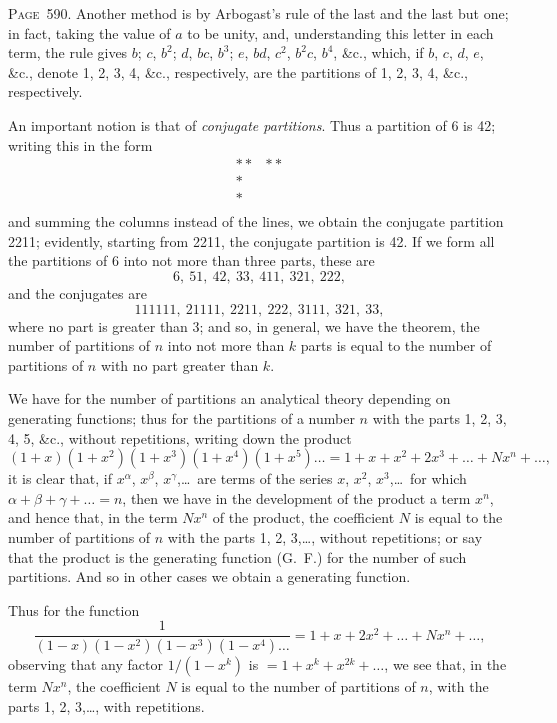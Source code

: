 \documentclass[11pt,a4paper]{book}
\begin{document}
\newpage
\noindent\textsc{Page~590.} Another method is by Arbogast's rule of the last and the last but one; in fact, taking the value of $a$ to be unity, and, understanding this letter in each term, the rule gives $b$; $c$, $b^2$; $d$, $bc$, $b^3$; $e$, $bd$, $c^2$, $b^2c$, $b^4$, \&c., which, if $b$, $c$, $d$, $e$, \&c., denote 1, 2, 3, 4, \&c., respectively, are the partitions of 1, 2, 3, 4, \&c., respectively.

An important notion is that of \textit{conjugate partitions}. Thus a partition of 6 is 42; writing this in the form
\[
\begin{array}{cc}
** & ** \\
* & \\
* & \\
\end{array}
\]
and summing the columns instead of the lines, we obtain the conjugate partition 2211; evidently, starting from 2211, the conjugate partition is 42. If we form all the partitions of 6 into not more than three parts, these are
\[
6,\ 51,\ 42,\ 33,\ 411,\ 321,\ 222,
\]
and the conjugates are
\[
111111,\ 21111,\ 2211,\ 222,\ 3111,\ 321,\ 33,
\]
where no part is greater than 3; and so, in general, we have the theorem, the number of partitions of $n$ into not more than $k$ parts is equal to the number of partitions of $n$ with no part greater than $k$.

We have for the number of partitions an analytical theory depending on generating functions; thus for the partitions of a number $n$ with the parts 1, 2, 3, 4, 5, \&c., without repetitions, writing down the product
\[
(1+x)(1+x^2)(1+x^3)(1+x^4)(1+x^5)\ldots = 1+x+x^2+2x^3+\ldots +Nx^n+\ldots,
\]
it is clear that, if $x^\alpha$, $x^\beta$, $x^\gamma$,\ldots\ are terms of the series $x$, $x^2$, $x^3$,\ldots\ for which $\alpha+\beta+\gamma+\ldots=n$, then we have in the development of the product a term $x^n$, and hence that, in the term $Nx^n$ of the product, the coefficient $N$ is equal to the number of partitions of $n$ with the parts 1, 2, 3,\ldots, without repetitions; or say that the product is the generating function (G.\ F.) for the number of such partitions. And so in other cases we obtain a generating function.

Thus for the function
\[
\frac{1}{(1-x)(1-x^2)(1-x^3)(1-x^4)\ldots} = 1+x+2x^2+\ldots+Nx^n+\ldots,
\]
observing that any factor $1/(1-x^k)$ is $=1+x^k+x^{2k}+\ldots$, we see that, in the term $Nx^n$, the coefficient $N$ is equal to the number of partitions of $n$, with the parts 1, 2, 3,\ldots, with repetitions.
\end{document}
